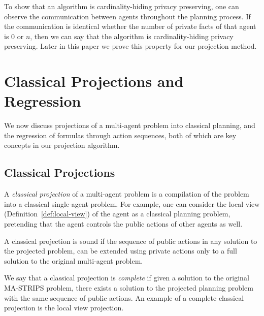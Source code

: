 \documentclass[letterpaper]{article}
\newcommand\roni[1]{\textcolor{blue}{roni: #1}}
\theoremstyle{definition}
\begin{document}
To show that an algorithm is cardinality-hiding privacy preserving, one can observe the communication between agents throughout the planning process. If the communication is identical whether the number of private facts of that agent is $0$ or $n$, then we can say that the algorithm is cardinality-hiding privacy preserving. Later in this paper we prove this property for our projection method. 




\section{Classical Projections and Regression}

We now discuss projections of a multi-agent problem into classical planning, and the regression of formulas through action sequences, both of which are key concepts in our projection algorithm.

\subsection{Classical Projections}


A {\em classical projection} of a multi-agent problem is a compilation of the problem into a classical single-agent problem. For example, one can consider the local view (Definition~\ref{def:local-view}) of the agent as a classical planning problem, pretending that the agent controls the public actions of other agents as well.

A classical projection is sound if the sequence of public actions in any solution to the projected problem, can be extended using private actions only to a full solution to the original multi-agent problem.

We say that a classical projection is {\em complete} if given a solution to the original MA-STRIPS problem, there exists a solution to the projected planning problem with the same sequence of public actions. An example of a complete classical projection is the local view projection. 
\end{document}
